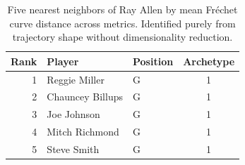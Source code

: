 \begin{table}[htbp]
  \centering\small
  \begin{tabular}{rllc}
    \toprule
    Rank & Player & Position & Archetype \\
    \midrule
    1 & Reggie Miller & G & 1 \\
    2 & Chauncey Billups & G & 1 \\
    3 & Joe Johnson & G & 1 \\
    4 & Mitch Richmond & G & 1 \\
    5 & Steve Smith & G & 1 \\
    \bottomrule
  \end{tabular}
  \caption{Five nearest neighbors of Ray Allen by mean Fr\'{e}chet curve distance across metrics. Identified purely from trajectory shape without dimensionality reduction.}
  \label{tab:Ray_Allen_frechet_curve_neighbors}
\end{table}


